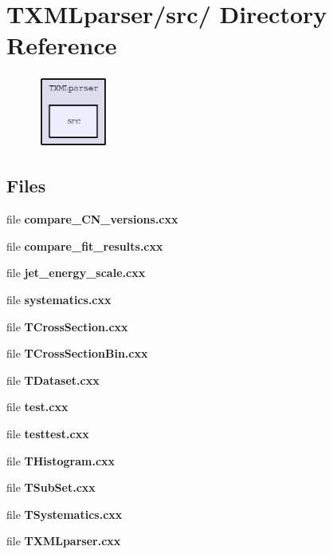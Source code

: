 \section{TXMLparser/src/ Directory Reference}
\label{dir_024a67901667cd97b93f5d98a08241b6}


\begin{figure}[H]
\begin{center}
\leavevmode
\includegraphics[width=66pt]{dir_024a67901667cd97b93f5d98a08241b6_dep}
\end{center}
\end{figure}
\subsection*{Files}
\begin{CompactItemize}
\item 
file \textbf{compare\_\-CN\_\-versions.cxx}
\item 
file \textbf{compare\_\-fit\_\-results.cxx}
\item 
file \textbf{jet\_\-energy\_\-scale.cxx}
\item 
file \textbf{systematics.cxx}
\item 
file \textbf{TCross\-Section.cxx}
\item 
file \textbf{TCross\-Section\-Bin.cxx}
\item 
file \textbf{TDataset.cxx}
\item 
file \textbf{test.cxx}
\item 
file \textbf{testtest.cxx}
\item 
file \textbf{THistogram.cxx}
\item 
file \textbf{TSub\-Set.cxx}
\item 
file \textbf{TSystematics.cxx}
\item 
file \textbf{TXMLparser.cxx}
\end{CompactItemize}

